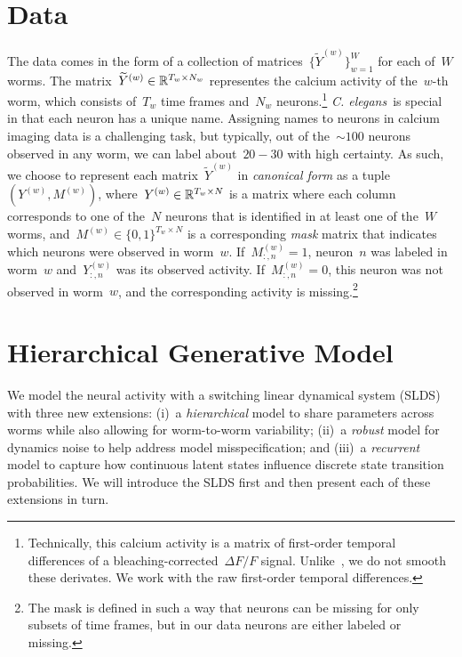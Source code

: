 \documentclass{article}
\newcommand{\celegans}{\textit{C. elegans}}
\begin{document}
\section{Data}
\label{sec:data}

The data comes in the form of a collection of matrices~$\{\widetilde{Y}^{(w)}\}_{w=1}^W$
for each of~$W$ worms.  The matrix~${\widetilde{Y}^{(w)} \in \mathbb{R}^{T_w \times N_w}}$
representes the calcium activity of the~$w$-th worm, which consists of~$T_w$
time frames and~$N_w$ neurons.\footnote{Technically, this calcium activity is
a matrix of first-order temporal differences of a
bleaching-corrected~$\Delta F /F$ signal. Unlike~\citet{kato2015global}, we
do not smooth these derivates. We work with the raw first-order
temporal differences.}  \celegans~is special in that each neuron has a unique
name.  Assigning names to neurons in calcium imaging data is a challenging
task, but typically, out of the~${\sim 100}$ neurons observed in any worm,
we can label about~$20-30$ with high certainty.  As such, we choose to
represent each matrix~$\widetilde{Y}^{(w)}$ in \emph{canonical form} as a
tuple~$(Y^{(w)}, M^{(w)})$, where~${Y^{(w)} \in \mathbb{R}^{T_w \times N}}$ is
a matrix where each column corresponds to one of the~$N$ neurons that is
identified in at least one of the~$W$ worms, and~${M^{(w)} \in \{0,1\}^{T_w \times N}}$
is a corresponding \emph{mask} matrix that indicates which neurons were
observed in worm~$w$.  If~$M_{:,n}^{(w)} = 1$, neuron~$n$ was labeled in
worm~$w$ and~$Y_{:,n}^{(w)}$ was its observed activity.  If~$M_{:,n}^{(w)}=0$,
this neuron was not observed in worm~$w$, and the corresponding activity
is missing.\footnote{The mask is defined in such a way that neurons can
  be missing for only subsets of time frames, but in our data neurons are
  either labeled or missing.}

\section{Hierarchical Generative Model}

We model the neural activity with a switching linear
dynamical system (SLDS) with three new extensions: (i)~a \emph{hierarchical} model
to share parameters across worms while also allowing for worm-to-worm
variability; (ii)~a \emph{robust} model for dynamics noise to help address
model misspecification; and (iii)~a \emph{recurrent} model to capture
how continuous latent states influence discrete state transition probabilities.
We will introduce the SLDS first and then present each of these extensions
in turn.
\end{document}

